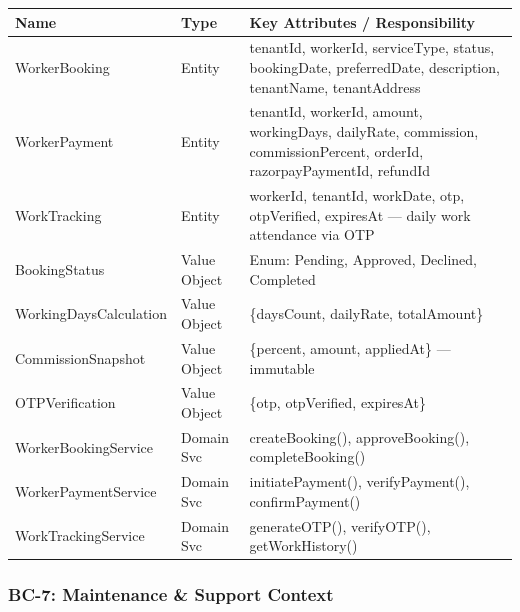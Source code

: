 \documentclass[12pt,a4paper]{article}
\begin{document}
\begin{center}
\begin{tabular}{@{}p{3.5cm}p{2cm}p{8.5cm}@{}}
\toprule
\textbf{Name} & \textbf{Type} & \textbf{Key Attributes / Responsibility} \\
\midrule
WorkerBooking & Entity & tenantId, workerId, serviceType, status, bookingDate, preferredDate, description, tenantName, tenantAddress \\
WorkerPayment & Entity & tenantId, workerId, amount, workingDays, dailyRate, commission, commissionPercent, orderId, razorpayPaymentId, refundId \\
WorkTracking & Entity & workerId, tenantId, workDate, otp, otpVerified, expiresAt — daily work attendance via OTP \\
BookingStatus & Value Object & Enum: Pending, Approved, Declined, Completed \\
WorkingDaysCalculation & Value Object & \{daysCount, dailyRate, totalAmount\} \\
CommissionSnapshot & Value Object & \{percent, amount, appliedAt\} — immutable \\
OTPVerification & Value Object & \{otp, otpVerified, expiresAt\} \\
WorkerBookingService & Domain Svc & createBooking(), approveBooking(), completeBooking() \\
WorkerPaymentService & Domain Svc & initiatePayment(), verifyPayment(), confirmPayment() \\
WorkTrackingService & Domain Svc & generateOTP(), verifyOTP(), getWorkHistory() \\
\bottomrule
\end{tabular}
\end{center}

\subsubsection{BC-7: Maintenance \& Support Context}
\end{document}
